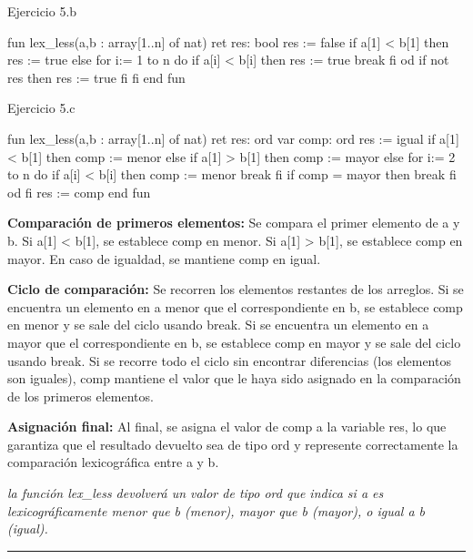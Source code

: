 \begin{codebox}{Ejercicio 5.b}
\begin{pascallike}
fun lex_less(a,b : array[1..n] of nat) ret res: bool
    res := false
    if a[1] < b[1] then
        res := true
    else
        for i:= 1 to n do
            if a[i] < b[i] then
                res := true
                break
            fi
        od
        if not res then
        res := true
        fi
    fi
end fun
\end{pascallike}
\end{codebox}

\begin{codebox}{Ejercicio 5.c}
\begin{pascallike}
fun lex_less(a,b : array[1..n] of nat) ret res: ord
    var comp: ord
    res := igual
    if a[1] < b[1] then
    comp := menor
    else if a[1] > b[1] then
    comp := mayor
    else
    for i:= 2 to n do
        if a[i] < b[i] then
            comp := menor
            break
        fi
        if comp = mayor then
            break
        fi
    od
    fi
    res := comp
end fun
\end{pascallike}
\end{codebox}

\textbf{Comparación de primeros elementos:} Se compara el primer elemento de a y b. Si a[1] < b[1], se establece comp en menor. Si a[1] > b[1], se establece comp en mayor. En caso de igualdad, se mantiene comp en igual.

\textbf{Ciclo de comparación:} Se recorren los elementos restantes de los arreglos. Si se encuentra un elemento en a menor que el correspondiente en b, se establece comp en menor y se sale del ciclo usando break. Si se encuentra un elemento en a mayor que el correspondiente en b, se establece comp en mayor y se sale del ciclo usando break. Si se recorre todo el ciclo sin encontrar diferencias (los elementos son iguales), comp mantiene el valor que le haya sido asignado en la comparación de los primeros elementos.

\textbf{Asignación final:} Al final, se asigna el valor de comp a la variable res, lo que garantiza que el resultado devuelto sea de tipo ord y represente correctamente la comparación lexicográfica entre a y b.

\textit{la función lex\_less devolverá un valor de tipo ord que indica si a es lexicográficamente menor que b (menor), mayor que b (mayor), o igual a b (igual).}

\begin{center}
    \rule{\textwidth}{0.4pt}
\end{center}

